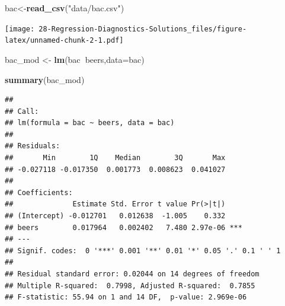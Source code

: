 \documentclass[
]{book}
\newenvironment{Shaded}{\begin{snugshade}}{\end{snugshade}}
\newcommand{\DataTypeTok}[1]{\textcolor[rgb]{0.13,0.29,0.53}{#1}}
\newcommand{\DecValTok}[1]{\textcolor[rgb]{0.00,0.00,0.81}{#1}}
\newcommand{\KeywordTok}[1]{\textcolor[rgb]{0.13,0.29,0.53}{\textbf{#1}}}
\newcommand{\NormalTok}[1]{#1}
\newcommand{\OperatorTok}[1]{\textcolor[rgb]{0.81,0.36,0.00}{\textbf{#1}}}
\newcommand{\StringTok}[1]{\textcolor[rgb]{0.31,0.60,0.02}{#1}}
\begin{document}
\begin{Shaded}
\begin{Highlighting}[]
\NormalTok{bac<-}\KeywordTok{read_csv}\NormalTok{(}\StringTok{"data/bac.csv"}\NormalTok{)}
\end{Highlighting}
\end{Shaded}

\begin{Shaded}
\end{Shaded}

\texttt{[image: 28-Regression-Diagnostics-Solutions\_files/figure-latex/unnamed-chunk-2-1.pdf]}

\begin{Shaded}
\begin{Highlighting}[]
\NormalTok{bac_mod <-}\StringTok{ }\KeywordTok{lm}\NormalTok{(bac}\OperatorTok{~}\NormalTok{beers,}\DataTypeTok{data=}\NormalTok{bac)}
\end{Highlighting}
\end{Shaded}

\begin{Shaded}
\begin{Highlighting}[]
\KeywordTok{summary}\NormalTok{(bac_mod)}
\end{Highlighting}
\end{Shaded}

\begin{verbatim}
## 
## Call:
## lm(formula = bac ~ beers, data = bac)
## 
## Residuals:
##       Min        1Q    Median        3Q       Max 
## -0.027118 -0.017350  0.001773  0.008623  0.041027 
## 
## Coefficients:
##              Estimate Std. Error t value Pr(>|t|)    
## (Intercept) -0.012701   0.012638  -1.005    0.332    
## beers        0.017964   0.002402   7.480 2.97e-06 ***
## ---
## Signif. codes:  0 '***' 0.001 '**' 0.01 '*' 0.05 '.' 0.1 ' ' 1
## 
## Residual standard error: 0.02044 on 14 degrees of freedom
## Multiple R-squared:  0.7998, Adjusted R-squared:  0.7855 
## F-statistic: 55.94 on 1 and 14 DF,  p-value: 2.969e-06
\end{verbatim}
\end{document}
